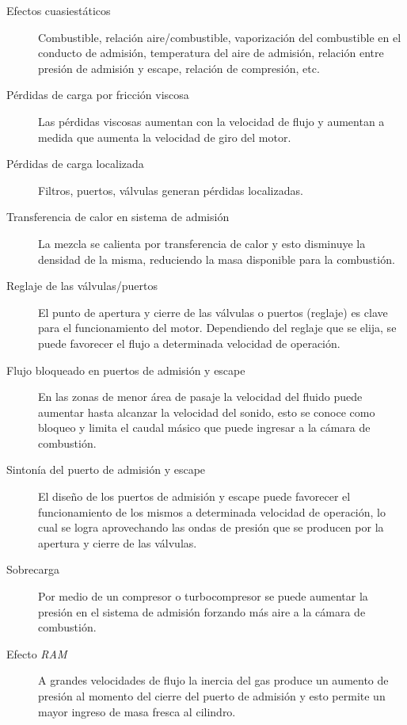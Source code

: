 \begin{description}
    \item [Efectos cuasiestáticos] Combustible, relación aire/combustible,
vaporización del combustible en el conducto de admisión, temperatura del aire de
admisión, relación entre presión de admisión y escape, relación de compresión,
etc.
  \item [Pérdidas de carga por fricción viscosa] Las pérdidas viscosas aumentan
con la velocidad de flujo y aumentan a medida que aumenta la velocidad de giro
del motor.
  \item [Pérdidas de carga localizada] Filtros, puertos, válvulas generan
pérdidas localizadas.
  \item [Transferencia de calor en sistema de admisión] La mezcla se calienta
por transferencia de calor y esto disminuye la densidad de la misma, reduciendo
la masa disponible para la combustión.
  \item [Reglaje de las válvulas/puertos] El punto de apertura y cierre de las
válvulas o  puertos (reglaje) es clave para el funcionamiento del motor.
Dependiendo del reglaje que se elija, se puede favorecer el flujo a determinada
velocidad de operación.
    \item [Flujo bloqueado en puertos de admisión y escape] En las zonas de
menor área de pasaje la velocidad del fluido puede aumentar hasta alcanzar la
velocidad del sonido, esto se conoce como bloqueo y limita el caudal másico que
puede ingresar a la cámara de combustión.
    \item [Sintonía del puerto de admisión y escape] El diseño de los puertos de
admisión y escape puede favorecer el funcionamiento de los mismos a determinada
velocidad de operación, lo cual se logra aprovechando las ondas de presión que se
producen por la apertura y cierre de las válvulas.
  \item [Sobrecarga] Por medio de un compresor o turbocompresor se puede
aumentar la presión en el sistema de admisión forzando más aire a la cámara de
combustión.
    \item [Efecto \textit{RAM}] A grandes velocidades de flujo la inercia del gas produce
un aumento de presión al momento del cierre del puerto de admisión y esto
permite un mayor ingreso de masa fresca al cilindro.
\end{description}

